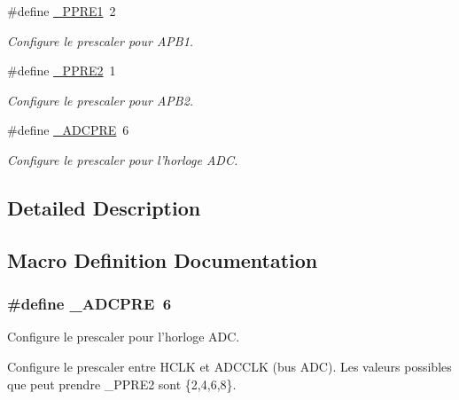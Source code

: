 \begin{DoxyCompactItemize}
\#define \hyperlink{group__conf___c_l_o_c_k_ga961057d8de29befd974b2d51240d34b7}{\+\_\+\+P\+P\+R\+E1}~2
\begin{DoxyCompactList}\small\item\em Configure le prescaler pour A\+P\+B1. \end{DoxyCompactList}\item 
\#define \hyperlink{group__conf___c_l_o_c_k_ga4a84605b8fbe4331f82f31572873bc19}{\+\_\+\+P\+P\+R\+E2}~1
\begin{DoxyCompactList}\small\item\em Configure le prescaler pour A\+P\+B2. \end{DoxyCompactList}\item 
\#define \hyperlink{group__conf___c_l_o_c_k_ga74c51cc88682c8c186b7e3ec27ec8bdb}{\+\_\+\+A\+D\+C\+P\+R\+E}~6
\begin{DoxyCompactList}\small\item\em Configure le prescaler pour l'horloge A\+D\+C. \end{DoxyCompactList}\end{DoxyCompactItemize}


\subsection{Detailed Description}


\subsection{Macro Definition Documentation}
\hypertarget{group__conf___c_l_o_c_k_ga74c51cc88682c8c186b7e3ec27ec8bdb}{
\subsubsection[{\+\_\+\+A\+D\+C\+P\+R\+E}]{\setlength{\rightskip}{0pt plus 5cm}\#define \+\_\+\+A\+D\+C\+P\+R\+E~6}}\label{group__conf___c_l_o_c_k_ga74c51cc88682c8c186b7e3ec27ec8bdb}


Configure le prescaler pour l'horloge A\+D\+C. 

Configure le prescaler entre H\+C\+L\+K et A\+D\+C\+C\+L\+K (bus A\+D\+C). Les valeurs possibles que peut prendre \+\_\+\+P\+P\+R\+E2 sont \{2,4,6,8\}.

